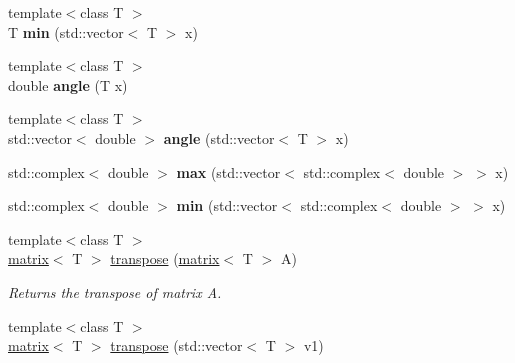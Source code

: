 \begin{DoxyCompactItemize}
\item 
\hypertarget{namespacekeycpp_a8ef49e492f67187d0909c7ae093fee48}{{\footnotesize template$<$class T $>$ }\\T {\bfseries min} (std\-::vector$<$ T $>$ x)}\label{namespacekeycpp_a8ef49e492f67187d0909c7ae093fee48}

\item 
\hypertarget{namespacekeycpp_a83c90b0df3a170c845b848593be4cb74}{{\footnotesize template$<$class T $>$ }\\double {\bfseries angle} (T x)}\label{namespacekeycpp_a83c90b0df3a170c845b848593be4cb74}

\item 
\hypertarget{namespacekeycpp_a13ee1c3dd9cbb21a325260188a7fa860}{{\footnotesize template$<$class T $>$ }\\std\-::vector$<$ double $>$ {\bfseries angle} (std\-::vector$<$ T $>$ x)}\label{namespacekeycpp_a13ee1c3dd9cbb21a325260188a7fa860}

\item 
\hypertarget{namespacekeycpp_a73269c9db9fe25412819858bd7048ae5}{std\-::complex$<$ double $>$ {\bfseries max} (std\-::vector$<$ std\-::complex$<$ double $>$ $>$ x)}\label{namespacekeycpp_a73269c9db9fe25412819858bd7048ae5}

\item 
\hypertarget{namespacekeycpp_ab7577228b38fa6a1911ac65fb80832f3}{std\-::complex$<$ double $>$ {\bfseries min} (std\-::vector$<$ std\-::complex$<$ double $>$ $>$ x)}\label{namespacekeycpp_ab7577228b38fa6a1911ac65fb80832f3}

\item 
\hypertarget{namespacekeycpp_ad68697505d1a1a85f30a18b0e9b0eb2f}{{\footnotesize template$<$class T $>$ }\\\hyperlink{classkeycpp_1_1matrix}{matrix}$<$ T $>$ \hyperlink{namespacekeycpp_ad68697505d1a1a85f30a18b0e9b0eb2f}{transpose} (\hyperlink{classkeycpp_1_1matrix}{matrix}$<$ T $>$ A)}\label{namespacekeycpp_ad68697505d1a1a85f30a18b0e9b0eb2f}

\begin{DoxyCompactList}\small\item\em Returns the transpose of matrix A. \end{DoxyCompactList}\item 
\hypertarget{namespacekeycpp_aa148d677899a0da5ab14edfc5057a97b}{{\footnotesize template$<$class T $>$ }\\\hyperlink{classkeycpp_1_1matrix}{matrix}$<$ T $>$ \hyperlink{namespacekeycpp_aa148d677899a0da5ab14edfc5057a97b}{transpose} (std\-::vector$<$ T $>$ v1)}\label{namespacekeycpp_aa148d677899a0da5ab14edfc5057a97b}


\end{DoxyCompactItemize}

